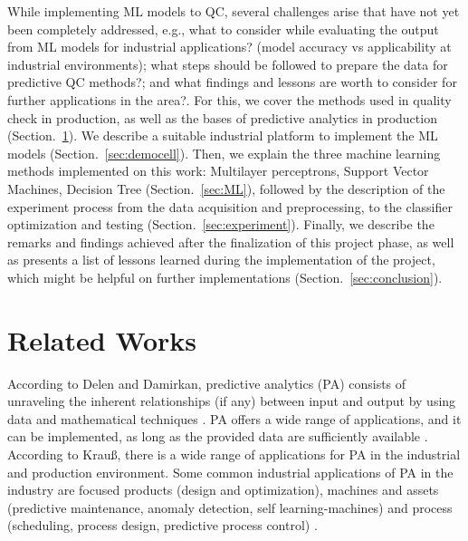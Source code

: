 \documentclass[5p,times,procedia]{elsarticle}
\begin{document}
While implementing ML models to QC, several challenges arise that have not yet been completely addressed, e.g., what to consider while evaluating the output from ML models for industrial applications? (model accuracy vs applicability at industrial environments); what steps should be followed to prepare the data for predictive QC methods?; and what findings and lessons are worth to consider for further applications in the area?. 
For this, we cover the methods used in quality check in production, as well as the bases of predictive analytics in production (Section.~\ref{sec:related_works}). 
We describe a suitable industrial platform to implement the ML models (Section.~\ref{sec:democell}).
Then, we explain the three machine learning methods implemented on this work: Multilayer perceptrons, Support Vector Machines, Decision Tree (Section.~\ref{sec:ML}), followed by the description of the experiment process from the data acquisition and preprocessing, to the classifier optimization and testing (Section.~\ref{sec:experiment}).
Finally, we describe the remarks and findings achieved after the finalization of this project phase, as well as presents a list of lessons learned during the implementation of the project, which might be helpful on further implementations (Section.~\ref{sec:conclusion}).

\section{Related Works} \label{sec:related_works}%

According to Delen and Damirkan, predictive analytics (PA) consists of unraveling the inherent relationships (if any) between input and output by using data and mathematical techniques \cite{delen2013data}.
PA offers a wide range of applications, and it can be implemented, as long as the provided data are sufficiently available \cite{bishop2006pattern}.
According to Krauß, there is a wide range of applications for PA in the industrial and production environment. Some common industrial applications of PA in the industry are focused products (design and optimization), machines and assets (predictive maintenance, anomaly detection, self learning-machines) and process (scheduling, process design, predictive process control) \cite{krauss2019machine}.
\end{document}
